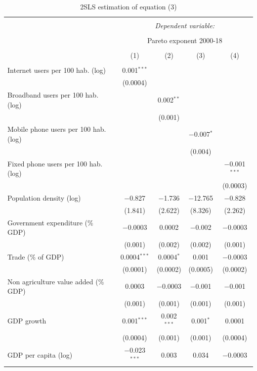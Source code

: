 \documentclass[10pt,letterpaper]{article}
\begin{document}
\begin{table}[!htbp] \centering 
  \caption{2SLS estimation of equation (3)\label{2sls.global}} 
  \label{} 
\small 
\begin{tabular}{@{\extracolsep{1pt}}lcccc} 
\\[-1.8ex]\hline 
\hline \\[-1.8ex] 
 & \multicolumn{4}{c}{\textit{Dependent variable:}} \\ 
\cline{2-5} 
\\[-1.8ex] & \multicolumn{4}{c}{Pareto exponent 2000-18} \\ 
\\[-1.8ex] & (1) & (2) & (3) & (4)\\ 
\hline \\[-1.8ex] 
 Internet users per 100 hab. (log) & 0.001$^{***}$ &  &  &  \\ 
  & (0.0004) &  &  &  \\ 
  Broadband users per 100 hab. (log) &  & 0.002$^{**}$ &  &  \\ 
  &  & (0.001) &  &  \\ 
  Mobile phone users per 100 hab. (log) &  &  & $-$0.007$^{*}$ &  \\ 
  &  &  & (0.004) &  \\ 
  Fixed phone users per 100 hab. (log) &  &  &  & $-$0.001$^{***}$ \\ 
  &  &  &  & (0.0003) \\ 
  Population density (log) & $-$0.827 & $-$1.736 & $-$12.765 & $-$0.828 \\ 
  & (1.841) & (2.622) & (8.326) & (2.262) \\ 
  Government expenditure (\% GDP) & $-$0.0003 & 0.0002 & $-$0.002 & $-$0.0003 \\ 
  & (0.001) & (0.002) & (0.002) & (0.001) \\ 
  Trade (\% of GDP) & 0.0004$^{***}$ & 0.0004$^{*}$ & 0.001 & $-$0.0003 \\ 
  & (0.0001) & (0.0002) & (0.0005) & (0.0002) \\ 
  Non agriculture value added (\% GDP) & 0.0003 & $-$0.0003 & $-$0.001 & $-$0.001 \\ 
  & (0.001) & (0.001) & (0.001) & (0.001) \\ 
  GDP growth & 0.001$^{***}$ & 0.002$^{***}$ & 0.001$^{*}$ & 0.0001 \\ 
  & (0.0004) & (0.001) & (0.001) & (0.0004) \\ 
  GDP per capita (log) & $-$0.023$^{***}$ & 0.003 & 0.034 & $-$0.0003 \\ 

\end{tabular}
\end{table}
\end{document}
